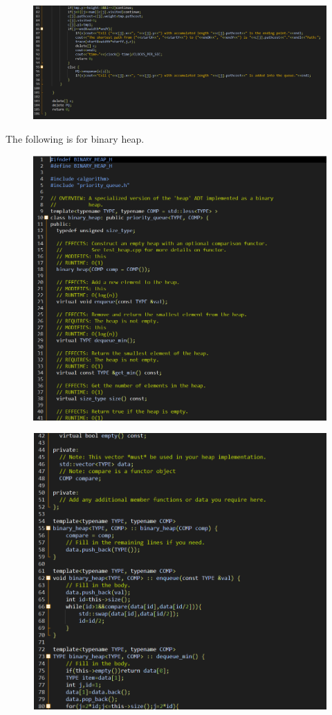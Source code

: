 \documentclass[12pt]{article}
\begin{document}
\begin{figure}[H]
\centering
\includegraphics[scale=0.6]{P6.png}
\end{figure}
The following is for binary heap.
\begin{figure}[H]
\centering
\includegraphics[scale=0.6]{P7.png}
\end{figure}
\begin{figure}[H]
\centering
\includegraphics[scale=0.6]{P8.png}
\end{figure}
\end{document}

